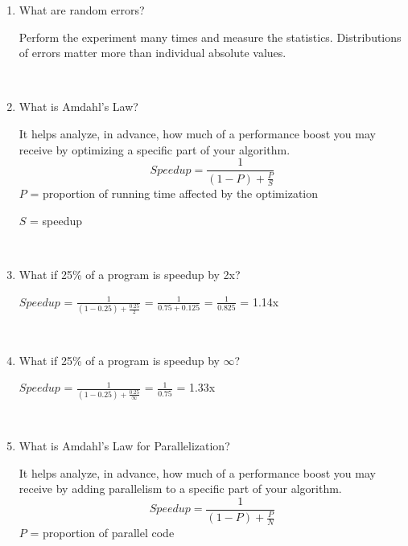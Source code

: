 \documentclass[12pt]{article}
\newenvironment{QandA}{\begin{enumerate}[label=\bfseries\arabic*.]\bfseries}
                      {\end{enumerate}}
\newenvironment{answered}{\par\quad\normalfont}{}
\begin{document}
\begin{QandA}
        \
        
    \item What are random errors?
        \begin{answered}
        Perform the experiment many times and measure the statistics. Distributions of errors matter more than individual absolute values.
        \end{answered}
        
        \
        
    \item What is Amdahl's Law?
        \begin{answered}
        It helps analyze, in advance, how much of a performance boost you may receive by optimizing a specific part of your algorithm. 
        \begin{equation}
            Speedup = \frac{1}{(1-P)+\frac{P}{S}}
        \end{equation}
        $P$ = proportion of running time affected by the optimization
        
        $S$ = speedup
        \end{answered}
        
        \
        
    \item What if 25\% of a program is speedup by 2x?
        \begin{answered}
        $Speedup$ = $\frac{1}{(1-0.25) + \frac{0.25}{2}}$ = $\frac{1}{0.75 + 0.125}$ = $\frac{1}{0.825}$ = 1.14x
        \end{answered}
        
        \
        
    \item What if 25\% of a program is speedup by $\infty$?
        \begin{answered}
        $Speedup$ = $\frac{1}{(1-0.25) + \frac{0.25}{\infty}}$ = $\frac{1}{0.75}$ = 1.33x
        \end{answered}
        
        \
        
    \item What is Amdahl's Law for Parallelization?
        \begin{answered}
        It helps analyze, in advance, how much of a performance boost you may receive by adding parallelism to a specific part of your algorithm. 
        \begin{equation}
            Speedup = \frac{1}{(1-P)+\frac{P}{N}}
        \end{equation}
        $P$ = proportion of parallel code
        

\end{answered}
\end{QandA}
\end{document}
